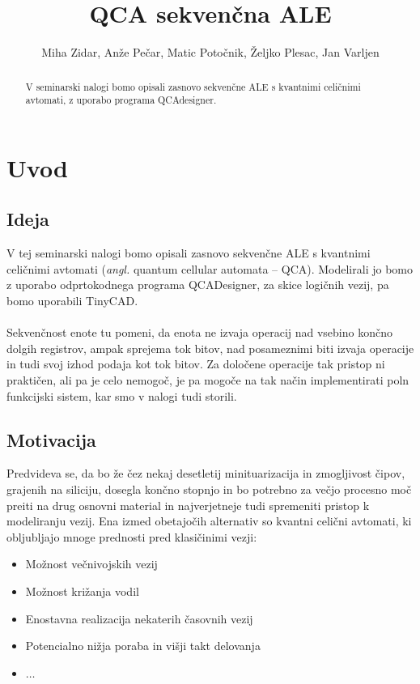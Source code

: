 \documentclass[seminar, slovene]{FRIreport}
\newcommand{\angl}[1]{(\textit{angl.} #1)}
\begin{document}
\title{QCA sekven\v cna ALE}

\author{Miha Zidar, Anže Pečar, Matic Potočnik, Željko Plesac, Jan Varljen}


\begin{abstract}
V seminarski nalogi bomo opisali zasnovo sekvenčne ALE s kvantnimi celičnimi avtomati, z uporabo programa QCAdesigner.

\end{abstract}

%
\section{Uvod}
\subsection{Ideja}
V tej seminarski nalogi bomo opisali zasnovo sekvenčne ALE s kvantnimi celičnimi avtomati \angl{quantum cellular automata -- QCA}. Modelirali jo bomo z uporabo odprtokodnega programa QCADesigner\cite{walus:2004}, za skice logičnih vezij, pa bomo uporabili TinyCAD.
\ \\ \ \\
Sekvenčnost enote tu pomeni, da enota ne izvaja operacij nad vsebino končno dolgih registrov, ampak sprejema tok bitov, nad posameznimi biti izvaja operacije in tudi svoj izhod podaja kot tok bitov. Za določene operacije tak pristop ni praktičen, ali pa je celo nemogoč, je pa mogoče na tak način implementirati poln funkcijski sistem, kar smo v nalogi tudi storili.

\subsection{Motivacija}
Predvideva se, da bo že čez nekaj desetletij minituarizacija in zmogljivost čipov, grajenih na siliciju, dosegla končno stopnjo in bo potrebno za večjo procesno moč preiti na drug osnovni material in najverjetneje tudi spremeniti pristop k modeliranju vezij. Ena izmed obetajočih alternativ so kvantni celični avtomati, ki obljubljajo mnoge prednosti pred klasičinimi vezji:
\begin{itemize}
\item Možnost večnivojskih vezij
\item Možnost križanja vodil
\item Enostavna realizacija nekaterih časovnih vezij
\item Potencialno nižja poraba in višji takt delovanja
\item $\dots$
\end{itemize}
\end{document}

